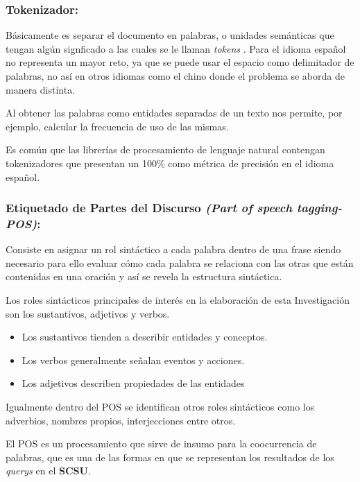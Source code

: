\documentclass[
  10,
  openany]{book}
\begin{document}
\hypertarget{token}{%
\subsubsection{Tokenizador:}\label{token}}

Básicamente es separar el documento en palabras, o unidades semánticas que tengan algún signficado a las cuales se le llaman \emph{tokens} \citep{straka2017}. Para el idioma español no representa un mayor reto, ya que se puede usar el espacio como delimitador de palabras, no así en otros idiomas como el chino donde el problema se aborda de manera distinta.

Al obtener las palabras como entidades separadas de un texto nos permite, por ejemplo, calcular la frecuencia de uso de las mismas.

Es común que las librerías de procesamiento de lenguaje natural contengan tokenizadores que presentan un 100\% como métrica de precisión en el idioma español.

\hypertarget{pos}{%
\subsubsection{\texorpdfstring{Etiquetado de Partes del Discurso \emph{(Part of speech tagging-POS)}:}{Etiquetado de Partes del Discurso (Part of speech tagging-POS):}}\label{pos}}

Consiste en asignar un rol sintáctico a cada palabra dentro de una frase \citep{eisenstein2019} siendo necesario para ello evaluar cómo cada palabra se relaciona con las otras que están contenidas en una oración y así se revela la estructura sintáctica.

Los roles sintácticos principales de interés en la elaboración de esta Investigación son los sustantivos, adjetivos y verbos.

\begin{itemize}
\item
  Los sustantivos tienden a describir entidades y conceptos.
\item
  Los verbos generalmente señalan eventos y acciones.
\item
  Los adjetivos describen propiedades de las entidades
\end{itemize}

Igualmente dentro del POS se identifican otros roles sintácticos como los adverbios, nombres propios, interjecciones entre otros.

El POS es un procesamiento que sirve de insumo para la coocurrencia de palabras, que es una de las formas en que se representan los resultados de los \emph{querys} en el \textbf{SCSU}.
\end{document}

